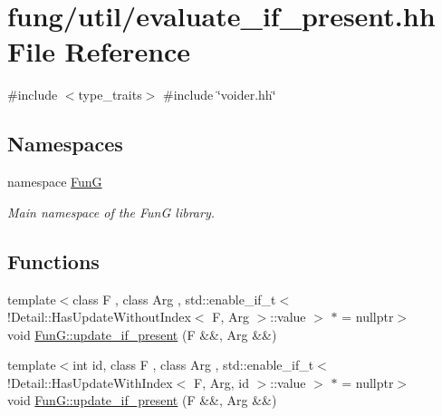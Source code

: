 \hypertarget{evaluate__if__present_8hh}{\section{fung/util/evaluate\-\_\-if\-\_\-present.hh \-File \-Reference}
\label{evaluate__if__present_8hh}
}
{\ttfamily \#include $<$type\-\_\-traits$>$}\*
{\ttfamily \#include \char`\"{}voider.\-hh\char`\"{}}\*
\subsection*{\-Namespaces}
\begin{DoxyCompactItemize}
\item 
namespace \hyperlink{namespaceFunG}{\-Fun\-G}
\begin{DoxyCompactList}\small\item\em \-Main namespace of the \-Fun\-G library. \end{DoxyCompactList}\end{DoxyCompactItemize}
\subsection*{\-Functions}
\begin{DoxyCompactItemize}
\item 
{\footnotesize template$<$class F , class Arg , std\-::enable\-\_\-if\-\_\-t$<$!\-Detail\-::\-Has\-Update\-Without\-Index$<$ F, Arg $>$\-::value $>$ $\ast$  = nullptr$>$ }\\void \hyperlink{namespaceFunG_a3b9d2e5d07b30c2ee26703b33e9adb9e}{\-Fun\-G\-::update\-\_\-if\-\_\-present} (\-F \&\&, \-Arg \&\&)
\item 
{\footnotesize template$<$int id, class F , class Arg , std\-::enable\-\_\-if\-\_\-t$<$!\-Detail\-::\-Has\-Update\-With\-Index$<$ F, Arg, id $>$\-::value $>$ $\ast$  = nullptr$>$ }\\void \hyperlink{namespaceFunG_aed5ddbef97c98202e818bca2b74c75d2}{\-Fun\-G\-::update\-\_\-if\-\_\-present} (\-F \&\&, \-Arg \&\&)
\end{DoxyCompactItemize}
